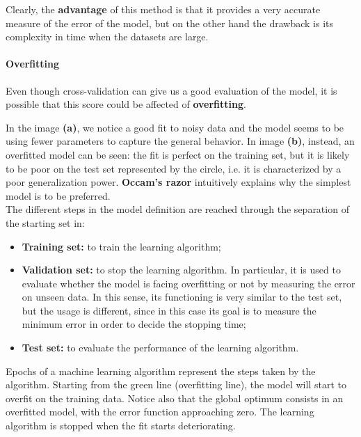 
Clearly, the \textbf{advantage} of this method is that it provides a very accurate measure of the error of the model, but on the other hand the drawback is its complexity in time when the datasets are large.

\paragraph{Overfitting}
Even though cross-validation can give us a good evaluation of the model, it is possible that this score could be affected of \textbf{overfitting}. 


In the image \textbf{(a)}, we notice a good fit to noisy data and the model seems to be using fewer parameters to capture the general behavior. In image \textbf{(b)}, instead, an overfitted model can be seen: the fit is perfect on the training set, but it is likely to be poor on the test set represented by the circle, i.e. it is characterized by a poor generalization power. \textbf{Occam's razor} intuitively explains why the simplest model is to be preferred.\\
The different steps in the model definition are reached through the separation of the starting set in:
\begin{itemize}
	\item \textbf{Training set:} to train the learning algorithm;
	\item \textbf{Validation set:} to stop the learning algorithm. In particular, it is used to evaluate whether the model is facing overfitting or not by measuring the error on unseen data. In this sense, its functioning is very similar to the test set, but the usage is different, since in this case its goal is to measure the minimum error in order to decide the stopping time;
	\item \textbf{Test set:} to evaluate the performance of the learning algorithm.
\end{itemize}
Epochs of a machine learning algorithm represent the steps taken by the algorithm. Starting from the green line (overfitting line), the model will start to overfit on the training data. Notice also that the global optimum consists in an overfitted model, with the error function approaching zero.
The learning algorithm is stopped when the fit starts deteriorating.


